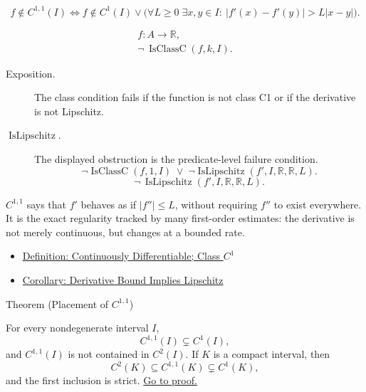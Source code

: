 \begin{remark*}
\[
  f\notin C^{1,1}(I)
  \Longleftrightarrow
  f\notin C^1(I)\vee
  \bigl(\forall L\geq0\;\exists x,y\in I:\ |f'(x)-f'(y)|>L|x-y|\bigr).
\]
\end{remark*}

\begin{remark*}
\[
\begin{aligned}
  f\colon A\to\mathbb{R},\\
\neg\,\operatorname{IsClassC}(f,k,I).
\end{aligned}
\]
\end{remark*}




\begin{remark*}
\begin{description}
  \item[Exposition.]
  The class condition fails if the function is not class C1 or if the derivative is not Lipschitz.

  \item[\(\operatorname{IsLipschitz}.\)]
  The displayed obstruction is the predicate-level failure condition.
  \[
  \neg\operatorname{IsClassC}(f,1,I)\;\lor\;\neg\operatorname{IsLipschitz}(f',I,\mathbb{R},\mathbb{R},L).
  \]
  \[
  \neg\,\operatorname{IsLipschitz}(f',I,\mathbb{R},\mathbb{R},L).
  \]
\end{description}
\end{remark*}



\begin{remark*}[Interpretation]
\(C^{1,1}\) says that \(f'\) behaves as if \(|f''|\leq L\), without requiring
\(f''\) to exist everywhere. It is the exact regularity tracked by many
first-order estimates: the derivative is not merely continuous, but changes
at a bounded rate.
\end{remark*}

\begin{dependencies}
\begin{itemize}
  \item \hyperref[def:class-c1]{Definition: Continuously Differentiable; Class \(C^1\)}
  \item \hyperref[cor:derivative-bound-implies-lipschitz]{Corollary: Derivative Bound Implies Lipschitz}
\end{itemize}
\end{dependencies}

\begin{theorembox}{Theorem (Placement of \(C^{1,1}\))}
\begin{theorem}[Placement of \(C^{1,1}\)]
\label{thm:c11-placement}
For every nondegenerate interval \(I\),
\[
  C^{1,1}(I)\subsetneq C^1(I),
\]
and \(C^{1,1}(I)\) is not contained in \(C^2(I)\). If \(K\) is a compact
interval, then
\[
  C^2(K)\subseteq C^{1,1}(K)\subsetneq C^1(K),
\]
and the first inclusion is strict.
\hyperref[prf:c11-placement]{Go to proof.}
\end{theorem}
\end{theorembox}

